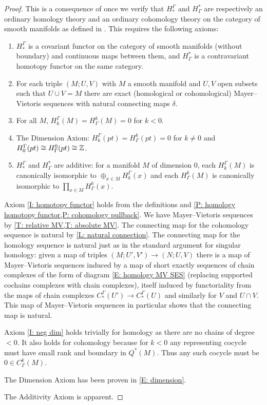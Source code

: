 \begin{proof}
	This is a consequence of \cite[Theorem 10]{Krec10b} once we verify that $H_*^\Gamma$ and $H^*_\Gamma$ are respectively an ordinary homology theory and an ordinary cohomology theory on the category of smooth manifolds as defined in \cite{Krec10b}.
	This requires the following axioms:

	\begin{enumerate}
		\item\label{I: homotopy functor} $H_*^\Gamma$ is a covariant functor on the category of smooth manifolds (without boundary) and continuous maps between them, and $H^*_\Gamma$ is a contravariant homotopy functor on the same category.

		\item For each triple $(M;U,V)$ with $M$ a smooth manifold and $U,V$ open subsets such that $U \cup V = M$ there are exact (homological or cohomological) Mayer--Vietoris sequences with natural connecting maps $\delta$.

		\item\label{I: neg dim} For all $M$, $H_k^\Gamma(M) = H^k_\Gamma(M) = 0$ for $k<0$.

		\item The Dimension Axiom: $H_k^\Gamma(pt) = H^k_\Gamma(pt) = 0$ for $k\neq 0$ and $H^\Gamma_0(pt) \cong H_\Gamma^0(pt) \cong \mathbb{Z}$.

		\item $H_*^\Gamma$ and $H^*_\Gamma$ are additive: for a manifold $M$ of dimension $0$, each $H_k^\Gamma(M)$ is canonically isomorphic to $\oplus_{x \in M} H_k^\Gamma(x)$ and each $H^k_\Gamma(M)$ is canonically isomorphic to $\prod_{x \in M} H^k_\Gamma(x)$.
	\end{enumerate}

	Axiom \ref{I: homotopy functor} holds from the definitions and \cref{P: homology homotopy functor,P: cohomology pullback}.
	We have Mayer--Vietoris sequences by \cref{T: relative MV,T: absolute MV}.
	The connecting map for the cohomology sequence is natural by \cref{L: natural connection}.
	The connecting map for the homology sequence is natural just as in the standard argument for singular homology: given a map of triples $(M;U',V') \to (N;U,V)$ there is a map of Mayer--Vietoris sequences induced by a map of short exactly sequences of chain complexes of the form of diagram \eqref{E: homology MV SES} (replacing supported cochains complexes with chain complexes), itself induced by functoriality from the maps of chain complexes $C_*^{\Gamma}(U') \to C_*^{\Gamma}(U)$ and similarly for $V$ and $U \cap V$.
	This map of Mayer--Vietoris sequences in particular shows that the connecting map is natural.

	Axiom \ref{I: neg dim} holds trivially for homology as there are no chains of degree $<0$.
	It also holds for cohomology because for $k<0$ any representing cocycle must have small rank and boundary in $Q^*(M)$.
	Thus any such cocycle must be $0 \in C^k_\Gamma(M)$.

	The Dimension Axiom has been proven in \cref{E: dimension}.

	The Additivity Axiom is apparent.
\end{proof}

